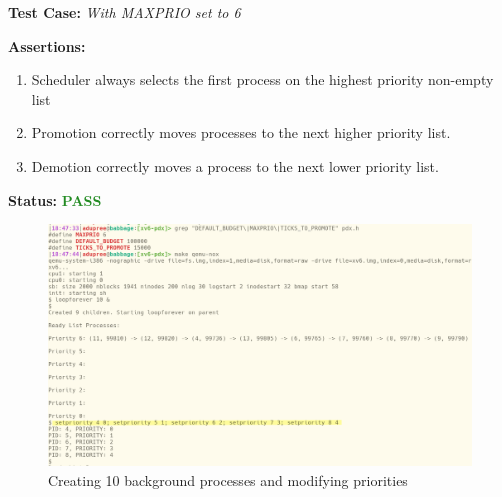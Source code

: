 \documentclass[11pt,letterpaper]{report}
\begin{document}
{  \pagebreak

  \noindent\textbf{Test Case:} \emph{With MAXPRIO set to 6}
  
  \noindent\textbf{Assertions:}
  \begin{enumerate}[]
  \item Scheduler always selects the first process on the highest priority non-empty list
  \item Promotion correctly moves processes to the next higher priority list. 
  \item Demotion correctly moves a process to the next lower priority list.
  \end{enumerate}  
  
  \noindent\textbf{Status:} \textcolor{ForestGreen}{\textbf{PASS}}\\
  
  \begin{figure}[h!]
	\centering
	\includegraphics[width=1\linewidth]{maxprio-6-lists1.png}
	\caption[img]{Creating 10 background processes and modifying priorities}
	\label{fig:P1compileP0-1}
  \end{figure}

}
\end{document}
